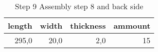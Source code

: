 \begin{table}[h!]
\centering
\caption{Step 9 Assembly step 8 and back side}
\begin{tabular}{rrrr}
\toprule
 length &  width &  thickness &  ammount \\
\midrule
  295,0 &   20,0 &        2,0 &       15 \\
\bottomrule
\end{tabular}
\end{table}
